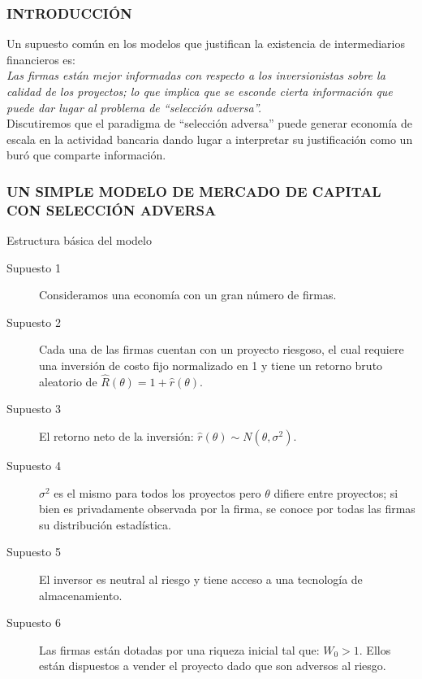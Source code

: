 \begin{frame}
	\frametitle{{\normalsize INTRODUCCIÓN} {}}
	\setcounter{equation}{0}
Un supuesto común en los modelos que justifican la existencia de intermediarios financieros es:\\
\textit{Las firmas están mejor informadas con respecto a los inversionistas sobre la calidad de los proyectos; lo que implica que se esconde cierta información que puede dar lugar al problema de ``selección adversa''.}\\
Discutiremos que el paradigma de ``selección adversa'' puede generar economía de escala en la actividad bancaria dando lugar a interpretar su justificación como un buró que comparte información.\\
 

\end{frame}

\begin{frame}
    \frametitle{{\normalsize UN SIMPLE MODELO DE MERCADO DE CAPITAL CON SELECCIÓN ADVERSA} {}}
    
    \begin{block} {Estructura básica del modelo}
        \begin{description}
            \item[Supuesto 1] Consideramos una economía con un gran número de firmas.
            \item[Supuesto 2] Cada una de las firmas cuentan con un proyecto riesgoso, el cual requiere una inversión de costo fijo normalizado en 1 y tiene un retorno bruto aleatorio de $\hat{R}(\theta)=1+\hat{r}(\theta) $. 
            \item[Supuesto 3] El retorno neto de la inversión: $\hat{r}(\theta)\sim N(\theta,\sigma^{2}) $.
            \item[Supuesto 4] $\sigma^{2} $ es el mismo para todos los proyectos pero $ \theta$ difiere entre proyectos; si bien es privadamente observada por la firma, se conoce por todas las firmas su distribución estadística. 
            \item[Supuesto 5]  El inversor es neutral al riesgo y tiene acceso a una tecnología de almacenamiento.
            \item[Supuesto 6]  Las firmas están dotadas por una riqueza inicial tal que: $W_{0}>1 $. Ellos están dispuestos a vender el proyecto dado que son adversos al riesgo.
            \end{description}
        
    \end{block}	
    
\end{frame}


